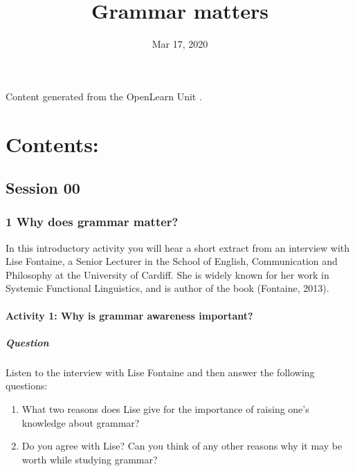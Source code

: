 \documentclass[letterpaper,10pt,english]{sphinxmanual}
\title{Grammar matters}
\date{Mar 17, 2020}
\author{}
\begin{document}
\pagestyle{empty}
\sphinxmaketitle
\pagestyle{plain}
\sphinxtableofcontents
\pagestyle{normal}
\label{\detokenize{index::doc}}


Content generated from the OpenLearn Unit .


\chapter{Contents:}
\label{\detokenize{index:contents}}

\section{Session 00}
\label{\detokenize{index:session-00}}

\subsection{1 Why does grammar matter?}
\label{\detokenize{content/session_00/Part_00_01:1-Why-does-grammar-matter?}}\label{\detokenize{content/session_00/Part_00_01::doc}}
In this introductory activity you will hear a short extract from an interview with Lise Fontaine, a Senior Lecturer in the School of English, Communication and Philosophy at the University of Cardiff. She is widely known for her work in Systemic Functional Linguistics, and is author of the book  (Fontaine, 2013).


\subsubsection{Activity 1: Why is grammar awareness important?}
\label{\detokenize{content/session_00/Part_00_01:Activity-1:-Why-is-grammar-awareness-important?}}


\paragraph{Question}
\label{\detokenize{content/session_00/Part_00_01:Question}}
Listen to the interview with Lise Fontaine and then answer the following questions:
\begin{enumerate}
%
\item {} 
What two reasons does Lise give for the importance of raising one’s knowledge about grammar?

\item {} 
Do you agree with Lise? Can you think of any other reasons why it may be worth while studying grammar?

\end{enumerate}
\end{document}
